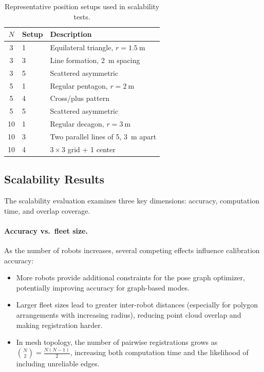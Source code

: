 \begin{table}[htbp]
    \centering
    \caption{Representative position setups used in scalability tests.}
    \label{tab:scale_configs}
    \small
    \begin{tabular}{c l l}
        \toprule
        $N$ & \textbf{Setup} & \textbf{Description} \\
        \midrule
        3  & 1 & Equilateral triangle, $r = \SI{1.5}{\metre}$ \\
        3  & 3 & Line formation, \SI{2}{\metre} spacing \\
        3  & 5 & Scattered asymmetric \\
        \midrule
        5  & 1 & Regular pentagon, $r = \SI{2}{\metre}$ \\
        5  & 4 & Cross/plus pattern \\
        5  & 5 & Scattered asymmetric \\
        \midrule
        10 & 1 & Regular decagon, $r = \SI{3}{\metre}$ \\
        10 & 3 & Two parallel lines of 5, \SI{3}{\metre} apart \\
        10 & 4 & $3 \times 3$ grid + 1 center \\
        \bottomrule
    \end{tabular}
\end{table}

\subsection{Scalability Results}
\label{sec:scale_results}


The scalability evaluation examines three key dimensions:
accuracy, computation time, and overlap coverage.

\paragraph{Accuracy vs.\ fleet size.}
As the number of robots increases, several competing effects influence
calibration accuracy:
\begin{itemize}
    \item More robots provide additional constraints for the pose graph
          optimizer, potentially improving accuracy for graph-based modes.
    \item Larger fleet sizes lead to greater inter-robot distances
          (especially for polygon arrangements with increasing radius),
          reducing point cloud overlap and making registration harder.
    \item In mesh topology, the number of pairwise registrations grows
          as $\binom{N}{2} = \frac{N(N-1)}{2}$, increasing both
          computation time and the likelihood of including unreliable
          edges.
\end{itemize}

